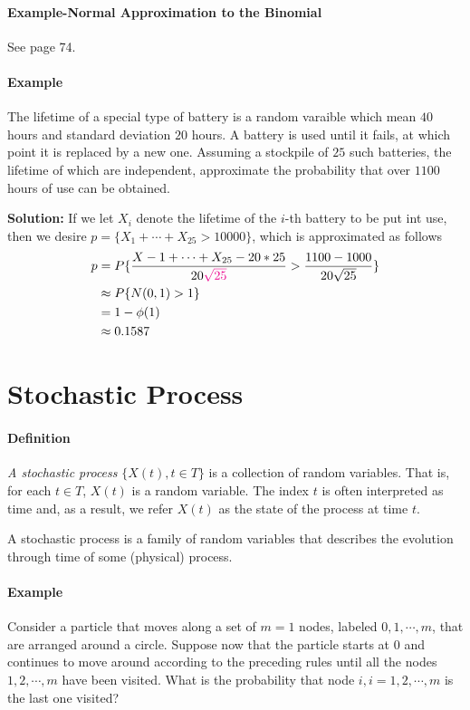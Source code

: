 \documentclass[10 pt,final]{article}
\newcommand{\impo}[1]{{\color{magenta} #1}}
\begin{document}
\paragraph{Example-Normal Approximation to the Binomial} See page 74.

\paragraph{Example} The lifetime of a special type of battery is a random varaible which mean $40$ hours and standard deviation $20$ hours. A battery is used until it fails, at which point it is replaced by a new one. Assuming a stockpile of $25$ such batteries, the lifetime of which are independent, approximate the probability that over $1100$ hours of use can be obtained. 

\textbf{Solution:} If we let $X_i$ denote the lifetime of the $i$-th battery to be put int use, then we desire $p = \{X_1 + \cdots + X_{25} > 10000\}$, which is approximated as follows
\begin{align*}
p & = P\{\frac{X-1 + \cdots + X_{25}-20*25}{20\impo{\sqrt{25}}} > \frac{1100-1000}{20\sqrt{25}}\} \\
& \approx P\{N(0,1) > 1\} \\
& = 1- \phi(1) \\
& \approx 0.1587
\end{align*}

\section{Stochastic Process}
\paragraph{Definition} \emph{A stochastic process} $\{X(t), t \in T\}$ is a collection of random variables. That is, for each $t \in T$, $X(t)$ is a random variable. The index $t$ is often interpreted as \impo{time} and, as a result, we refer $X(t)$ as the state of the process at time $t$.

A stochastic process is a family of random variables that \impo{describes the evolution through time of some (physical) process}.

\paragraph{Example} Consider a particle that moves along a set of $m=1$ nodes, labeled $0,1, \cdots, m$, that are arranged around a circle. Suppose now that the particle starts at $0$ and continues to move around according to the preceding rules until all the nodes $1,2, \cdots, m$ have been visited. What is the probability that node $i, i=1,2,\cdots, m$ is the last one visited?
\end{document}
